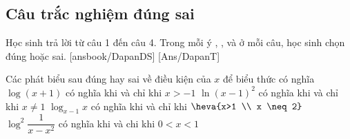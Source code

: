 \subsection{Câu trắc nghiệm đúng sai}
Học sinh trả lời từ câu 1 đến câu 4.
Trong mỗi ý , ,  và  ở mỗi câu, học sinh chọn đúng hoặc sai.
\setcounter{ex}{0}
\LGexTF
{}[ansbook/DapanDS]
[Ans/DapanT]
\begin{ex}%
Các phát biểu sau đúng hay sai về điều kiện của $x$ để biểu thức có nghĩa
\choiceTF
{\True $\log (x+1)$ có nghĩa khi và chỉ khi $x>-1$}
{\True $\ln (x-1)^2$ có nghĩa khi và chỉ khi $x \neq 1$}
{\True $\log _{x-1} x$ có nghĩa khi và chỉ khi $\heva {x>1 \\ x \neq 2}$}
{\True $\log ^2 \dfrac{1}{x-x^2}$ có nghĩa khi và chi khi $0<x<1$}
\end{ex} 

